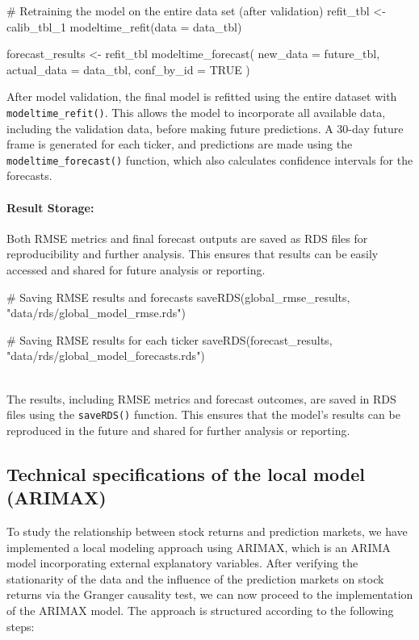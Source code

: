 \documentclass[12pt]{report}
\begin{document}
\begin{code}
# Retraining the model on the entire data set (after validation)
refit_tbl <- calib_tbl_1 %
  modeltime_refit(data = data_tbl) 

forecast_results <- refit_tbl %
  modeltime_forecast(
    new_data = future_tbl,  
    actual_data = data_tbl,  
    conf_by_id = TRUE 
  )
\end{code}

After model validation, the final model is refitted using the entire dataset with \texttt{modeltime\_refit()}. This allows the model to incorporate all available data, including the validation data, before making future predictions. A 30-day future frame is generated for each ticker, and predictions are made using the \texttt{modeltime\_forecast()} function, which also calculates confidence intervals for the forecasts.

\paragraph{Result Storage:}
Both RMSE metrics and final forecast outputs are saved as RDS files for reproducibility and further analysis. This ensures that results can be easily accessed and shared for future analysis or reporting.\\

\begin{code}
# Saving RMSE results and forecasts
saveRDS(global_rmse_results, "data/rds/global_model_rmse.rds")

# Saving RMSE results for each ticker
saveRDS(forecast_results, "data/rds/global_model_forecasts.rds")
\end{code}\\

The results, including RMSE metrics and forecast outcomes, are saved in RDS files using the \texttt{saveRDS()} function. This ensures that the model's results can be reproduced in the future and shared for further analysis or reporting.


\subsection{Technical specifications of the local model (ARIMAX)}
To study the relationship between stock returns and prediction markets, we have implemented a local modeling approach using ARIMAX, which is an ARIMA model incorporating external explanatory variables. After verifying the stationarity of the data and the influence of the prediction markets on stock returns via the Granger causality test, we can now proceed to the implementation of the ARIMAX model. The approach is structured according to the following steps:
\end{document}
